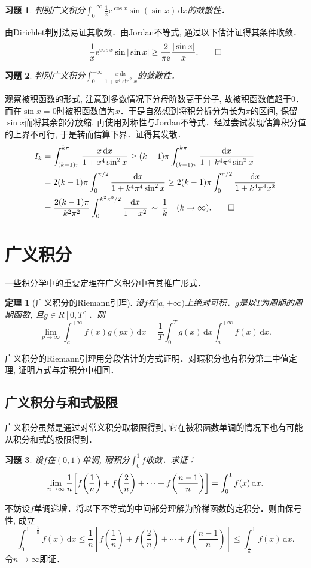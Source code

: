 \documentclass[11pt,a4paper]{ctexart}
\makeatletter
\theoremstyle{thmseries} %
\newtheorem{thm}{定理}[section]
\theoremstyle{exerseries}
\newtheorem{exer}{习题}[section]
\renewenvironment{proof}[1][\proofname]{\par
  \pushQED{\qed}%
  \normalfont \topsep6\p@\@plus6\p@\relax
  \trivlist
  \item[\hskip\labelsep
        \itshape
    #1\@addpunct{}]\ignorespaces
}{%
  \popQED\endtrivlist\@endpefalse
}
\newenvironment{sol}{\begin{proof}[\bfseries\upshape 解\quad]}{\end{proof}}
\newenvironment{pf}{\begin{proof}[\bfseries\upshape 证\quad]}{\end{proof}}
\newcommand{\bra}[1]{\mathopen{}\left(#1\right)}
\newcommand{\sbra}[1]{\mathopen{}\left[#1\right]}
\renewcommand{\d}{\mathrm{d}}
\newcommand{\e}{\mathrm{e}}
\def \nti {\mathnormal{n}\to\infty}
\makeatother
\begin{document}
\begin{exer}
	判别广义积分$\int_{0}^{+\infty}\frac{1}{x}\e^{\cos x}\sin(\sin x)\,\d x$的敛散性．
\end{exer}
\begin{sol}
	由Dirichlet判别法易证其收敛．由Jordan不等式, 通过以下估计证得其条件收敛．
	\[\frac{1}{x}\e^{\cos x}\sin|\sin x|\geq\frac{2}{\pi\e}\frac{|\sin x|}{x}.\qedhere\]
\end{sol}

\begin{exer}
	判别广义积分$\int_{0}^{+\infty}\frac{x\,\d x}{1+x^4\sin^2x}$的敛散性．
\end{exer}
\begin{sol}
	观察被积函数的形式, 注意到多数情况下分母阶数高于分子, 故被积函数值趋于$0$．而在$\sin x=0$时被积函数值为$x$．于是自然想到将积分拆分为长为$\pi$的区间, 保留$\sin x$而将其余部分放缩, 再使用对称性与Jordan不等式．经过尝试发现估算积分值的上界不可行, 于是转而估算下界．证得其发散．
	\begin{align*}
		I_k&=\int_{(k-1)\pi}^{k\pi}\frac{x\,\d x}{1+x^4\sin^2x}\geq(k-1)\pi\int_{(k-1)\pi}^{k\pi}\frac{\d x}{1+k^4\pi^4\sin^2x}\\
		&=2(k-1)\pi\int_{0}^{\pi/2}\frac{\d x}{1+k^4\pi^4\sin^2x}\geq2(k-1)\pi\int_{0}^{\pi/2}\frac{\d x}{1+k^4\pi^4x^2}\\
		&=\frac{2(k-1)\pi}{k^2\pi^2}\int_{0}^{k^2\pi^3/2}\frac{\d x}{1+x^2}\,\sim\,\frac{1}{k}\quad(k\to\infty).\qedhere
	\end{align*}
\end{sol}


\section{广义积分}
一些积分学中的重要定理在广义积分中有其推广形式．
\begin{thm}[广义积分的Riemann引理]
	设$f$在$[a,+\infty)$上绝对可积．$g$是以$T$为周期的周期函数, 且$g\in R[0,T]$．则
	\[\lim_{p\to\infty}\int_{a}^{+\infty}f(x)g(px)\,\d x=\frac{1}{T}\int_{0}^{T}g(x)\,\d x\int_{a}^{+\infty}f(x)\,\d x.\]
\end{thm}

广义积分的Riemann引理用分段估计的方式证明．对瑕积分也有积分第二中值定理, 证明方式与定积分中相同．


\subsection{广义积分与和式极限}
广义积分虽然是通过对常义积分取极限得到, 它在被积函数单调的情况下也有可能从积分和式的极限得到．
\begin{exer}
	设$f$在$(0,1)$单调, 瑕积分$\int_{0}^{1}f$收敛．求证：
	\[\lim_{\nti}\frac{1}{n}\sbra{f\bra{\frac{1}{n}}+f\bra{\frac{2}{n}}+\cdots+f\bra{\frac{n-1}{n}}}=\int_{0}^{1}f(x)\,\d x.\]
\end{exer}
\begin{pf}
	不妨设$f$单调递增．将以下不等式的中间部分理解为阶梯函数的定积分．则由保号性, 成立
	\[\int_{0}^{1-\frac{1}{n}}f(x)\,\d x\leq\frac{1}{n}\sbra{f\bra{\frac{1}{n}}+f\bra{\frac{2}{n}}+\cdots+f\bra{\frac{n-1}{n}}}\leq\int_{\frac{1}{n}}^{1}f(x)\,\d x.\]
	令$n\to\infty$即证．
\end{pf}
\end{document}
